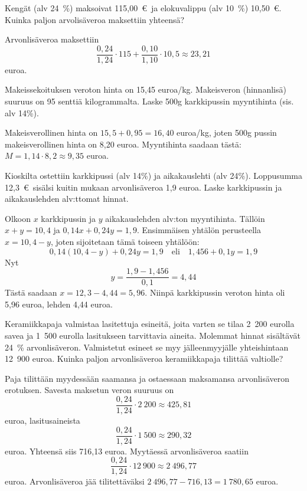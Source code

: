 \documentclass[a4paper,10pt]{article}\usepackage[]{graphicx}\usepackage[]{color}
\begin{document}
\begin{question}
  Kengät (alv 24~\%) maksoivat 115,00~\euro\ ja elokuvalippu (alv 10~\%) 10,50~\euro. Kuinka paljon arvolisäveroa maksettiin yhteensä?
\end{question}
\begin{solution}

  Arvonlisäveroa maksettiin 
  \[
    \frac{0,24}{1,24}\cdot115 + \frac{0,10}{1,10}\cdot10{,}5 
    \approx 23{,}21
  \] euroa.
\end{solution}

\begin{question}
  Makeissekoituksen veroton hinta on 15,45 euroa/kg. Makeisveron (hinnanlisä) suuruus on 95 senttiä kilogrammalta. Laske 500g karkkipussin myyntihinta (sis. alv 14\%).
\end{question}
\begin{solution}
  Makeisverollinen hinta on \(15{,}5+0{,}95 = 16{,}40\) euroa/kg, joten 500g pussin makeisverollinen hinta on 8,20 euroa. Myyntihinta saadaan tästä: \(M = 1,14\cdot8,2\approx9{,}35\) euroa.
\end{solution}



  \begin{question}
  Kioskilta ostettiin karkkipussi (alv 14\%) ja aikakauslehti (alv 24\%). Loppusumma 12{,}3~\euro\ sisälsi kuitin mukaan arvonlisäveroa 1{,}9 euroa. Laske karkkipussin ja aikakauslehden alv:ttomat hinnat.
\end{question}
\begin{solution}
  Olkoon \(x\) karkkipussin ja \(y\) aikakauslehden alv:ton myyntihinta. Tällöin \(x+y = 10{,}4\) ja \(0,14x + 0,24y = 1{,}9\). Ensimmäisen yhtälön perusteella \(x = 10{,}4 - y\), joten sijoitetaan tämä toiseen yhtälöön:
  \[
    0,14(10{,}4-y)+0,24y = 1{,}9 \quad\text{eli}\quad1{,}456 + 0{,}1y = 1{,}9
    \]
  Nyt
  \[
    y = \frac{1{,}9-1{,}456}{0{,}1} = 4{,}44
  \]
  Tästä saadaan \(x = 12{,}3 -4{,}44 = 5{,}96\). Niinpä karkkipussin veroton hinta oli  5{,}96 euroa, lehden 4{,}44 euroa.
\end{solution}


\begin{question}
  Keramiikkapaja valmistaa lasitettuja esineitä, joita varten se tilaa 2~200 eurolla savea ja 1~500 eurolla lasitukseen tarvittavia aineita. Molemmat hinnat sisältävät 24~\% arvonlisäveron. Valmistetut esineet se myy jälleenmyyjälle yhteishintaan 12~900 euroa. Kuinka paljon arvonlisäveroa keramiikkapaja tilittää valtiolle?
\end{question}
\begin{solution}
Paja tilittään myydessään saamansa ja ostaessaan maksamansa arvonlisäveron erotuksen. Savesta maksetun veron suuruus on 
  \[
  \frac{0,24}{1,24}\cdot2~200\approx 425{,}81
  \]
euroa, lasitusaineista 
  \[
  \frac{0,24}{1,24}\cdot1~500\approx290{,}32
  \]
euroa. Yhteensä siis 716{,}13 euroa. Myytäessä arvonlisäveroa saatiin
\[
  \frac{0,24}{1,24}\cdot12~900\approx2~496{,}77
\]
euroa. Arvonlisäveroa jää tilitettäväksi \(2~496{,}77 - 716{,}13 = 1~780{,}65\) euroa.
\end{solution}
\end{document}
